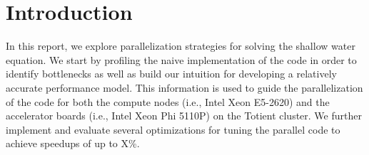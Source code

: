 
\section{Introduction}
\label{sec-intro}

In this report, we explore parallelization strategies for solving the
shallow water equation. We start by profiling the naive implementation of
the code in order to identify bottlenecks as well as build our intuition
for developing a relatively accurate performance model. This information
is used to guide the parallelization of the code for both the compute
nodes (i.e., Intel Xeon E5-2620) and the accelerator boards (i.e., Intel
Xeon Phi 5110P) on the Totient cluster. We further implement and evaluate
several optimizations for tuning the parallel code to achieve speedups of
up to X\%.

